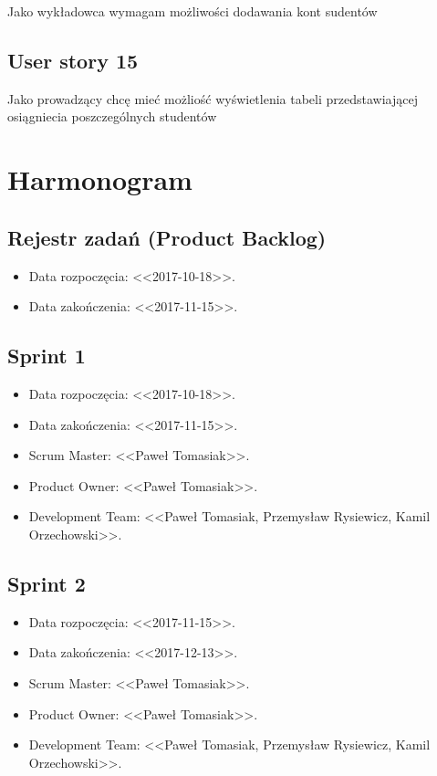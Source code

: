 \documentclass[a4paper]{article}
\begin{document}
Jako wykładowca wymagam możliwości dodawania kont sudentów

\subsection{User story 15}

Jako prowadzący chcę mieć możliość wyświetlenia tabeli przedstawiającej osiągniecia poszczególnych studentów

\section{Harmonogram}

\subsection{Rejestr zadań (Product Backlog)}

\begin{itemize}
\item Data rozpoczęcia: <<2017-10-18>>.
\item  Data zakończenia: <<2017-11-15>>.
\end{itemize}

\subsection{Sprint 1}

\begin{itemize}
\item Data rozpoczęcia: <<2017-10-18>>.
\item Data zakończenia: <<2017-11-15>>.
\item Scrum Master: <<Paweł Tomasiak>>.
\item Product Owner: <<Paweł Tomasiak>>.
\item Development Team: <<Paweł Tomasiak, Przemysław Rysiewicz, Kamil Orzechowski>>.
\end{itemize}

\subsection{Sprint 2}

\begin{itemize}
\item Data rozpoczęcia: <<2017-11-15>>.
\item  Data zakończenia: <<2017-12-13>>.
\item Scrum Master: <<Paweł Tomasiak>>.
\item Product Owner: <<Paweł Tomasiak>>.
\item Development Team: <<Paweł Tomasiak, Przemysław Rysiewicz, Kamil Orzechowski>>.
\end{itemize}
\end{document}
